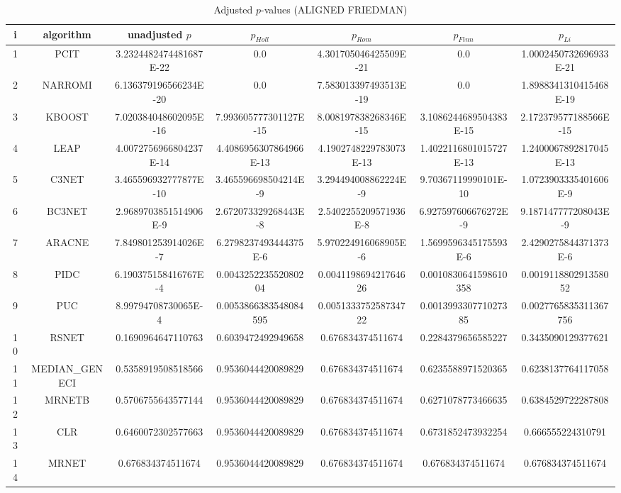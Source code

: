 \documentclass[a4paper,10pt]{article}
\begin{document}
\begin{landscape}
\begin{table}[!htp]
\centering\scriptsize
\caption{Adjusted $p$-values (ALIGNED FRIEDMAN)}
\begin{tabular}{ccccccc}
i&algorithm&unadjusted $p$&$p_{Holl}$&$p_{Rom}$&$p_{Finn}$&$p_{Li}$\\
\hline
1&PCIT&3.2324482474481687E-22&0.0&4.301705046425509E-21&0.0&1.0002450732696933E-21\\
2&NARROMI&6.136379196566234E-20&0.0&7.583013397493513E-19&0.0&1.8988341310415468E-19\\
3&KBOOST&7.020384048602095E-16&7.993605777301127E-15&8.008197838268346E-15&3.1086244689504383E-15&2.172379577188566E-15\\
4&LEAP&4.0072756966804237E-14&4.4086956307864966E-13&4.1902748229783073E-13&1.4022116801015727E-13&1.2400067892817045E-13\\
5&C3NET&3.465596932777877E-10&3.465596698504214E-9&3.294494008862224E-9&9.70367119990101E-10&1.0723903335401606E-9\\
6&BC3NET&2.9689703851514906E-9&2.672073329268443E-8&2.5402255209571936E-8&6.927597606676272E-9&9.187147777208043E-9\\
7&ARACNE&7.849801253914026E-7&6.2798237493444375E-6&5.970224916068905E-6&1.5699596345175593E-6&2.4290275844371373E-6\\
8&PIDC&6.190375158416767E-4&0.004325223552080204&0.004119869421764626&0.0010830641598610358&0.001911880291358052\\
9&PUC&8.99794708730065E-4&0.0053866383548084595&0.005133375258734722&0.001399330771027385&0.0027765835311367756\\
10&RSNET&0.1690964647110763&0.6039472492949658&0.676834374511674&0.2284379656585227&0.3435090129377621\\
11&MEDIAN_GENECI&0.5358919508518566&0.9536044420089829&0.676834374511674&0.6235588971520365&0.6238137764117058\\
12&MRNETB&0.5706755643577144&0.9536044420089829&0.676834374511674&0.6271078773466635&0.6384529722287808\\
13&CLR&0.6460072302577663&0.9536044420089829&0.676834374511674&0.6731852473932254&0.666555224310791\\
14&MRNET&0.676834374511674&0.9536044420089829&0.676834374511674&0.676834374511674&0.676834374511674\\
\hline
\end{tabular}
\end{table}


\newpage


\end{landscape}
\end{document}
